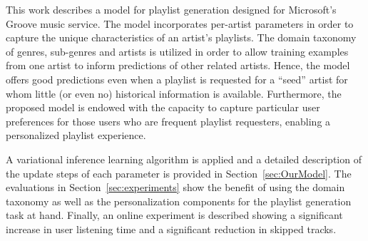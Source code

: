 This work describes a model for playlist generation designed for Microsoft's Groove music service. The model incorporates per-artist parameters in order to capture the unique characteristics of an artist's playlists. The domain taxonomy of genres, sub-genres and artists is utilized in order to allow training examples from one artist to inform predictions of other related artists. Hence, the model offers good predictions even when a playlist is requested for a ``seed'' artist for whom little (or even no) historical information is available. Furthermore, the proposed model is endowed with the capacity to capture particular user preferences for those users who are frequent playlist requesters, enabling a personalized playlist experience. %

A variational inference learning algorithm is applied and a detailed description of the update steps of each parameter is provided in Section~\ref{sec:OurModel}. %
The evaluations in Section~\ref{sec:experiments} show the benefit of using the domain taxonomy as well as the personalization components for the playlist generation task at hand. Finally, an online experiment is described showing a significant increase in user listening time and a significant reduction in skipped tracks. %

